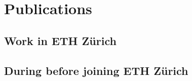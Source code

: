 \chapter*{Publications}


\section*{Work in ETH  Zürich}
\label{sec:during-study-eth-1}


\noindent
  \begin{refsection}
  \small%
    \nocite{Wyss_2019}
    \nocite{Huang_2019}
    \nocite{Tian_2018}
    \nocite{Tian_2018_cover}
    \nocite{Kumar_2018}
    \nocite{Tiefenauer_2018}
    \nocite{Griffin_2018}
    \nocite{Li_2018}
    \nocite{Jagielski_2017}
    \nocite{Tian_2017_2}
    \nocite{Tian_2017}
     \nocite{Kumar_2017}
    \nocite{Wang_2017}
    \nocite{Tian_2016}
  \printbibliography[heading=none]
\end{refsection}

\section*{During before joining  ETH  Zürich}

\noindent
\begin{refsection}[ownpubs]
  \small%
      \nocite{Gao_2017}
  \nocite{Tian_2015}
    \nocite{Wang_2015_2}
     \nocite{Wang_2015}
     \nocite{Zhang_2015}
    \nocite{Tian_2014}
    \nocite{Wang_2014}
    \nocite{Li_2014}
    \nocite{Xu_2014}
    \nocite{Xu_2014_2}
     \nocite{Zhu_2013}
    \nocite{Yang_2013}
    \nocite{Li_2013}
     \nocite{Li_2012}
  \printbibliography[heading=none]
\end{refsection}
